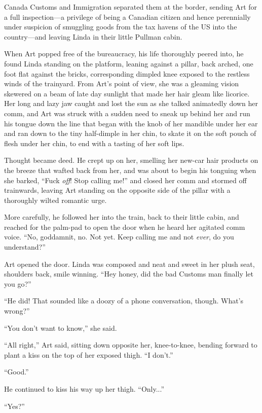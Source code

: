 Canada Customs and Immigration separated them at the border,
sending Art for a full inspection—a privilege of being a Canadian
citizen and hence perennially under suspicion of smuggling goods
from the tax havens of the US into the country—and leaving Linda in
their little Pullman cabin.

When Art popped free of the bureaucracy, his life thoroughly peered
into, he found Linda standing on the platform, leaning against a
pillar, back arched, one foot flat against the bricks,
corresponding dimpled knee exposed to the restless winds of the
trainyard. From Art’s point of view, she was a gleaming vision
skewered on a beam of late day sunlight that made her hair gleam
like licorice. Her long and lazy jaw caught and lost the sun as she
talked animatedly down her comm, and Art was struck with a sudden
need to sneak up behind her and run his tongue down the line that
began with the knob of her mandible under her ear and ran down to
the tiny half-dimple in her chin, to skate it on the soft pouch of
flesh under her chin, to end with a tasting of her soft lips.

Thought became deed. He crept up on her, smelling her new-car hair
products on the breeze that wafted back from her, and was about to
begin his tonguing when she barked, “Fuck \emph{off}! Stop calling
me!” and closed her comm and stormed off trainwards, leaving Art
standing on the opposite side of the pillar with a thoroughly
wilted romantic urge.

More carefully, he followed her into the train, back to their
little cabin, and reached for the palm-pad to open the door when he
heard her agitated comm voice. “No, goddamnit, no. Not yet. Keep
calling me and not \emph{ever}, do you understand?”

Art opened the door. Linda was composed and neat and sweet in her
plush seat, shoulders back, smile winning. “Hey honey, did the bad
Customs man finally let you go?”

“He did! That sounded like a doozy of a phone conversation, though.
What’s wrong?”

“You don’t want to know,” she said.

“All right,” Art said, sitting down opposite her, knee-to-knee,
bending forward to plant a kiss on the top of her exposed thigh. “I
don’t.”

“Good.”

He continued to kiss his way up her thigh. “Only...”

“Yes?”

